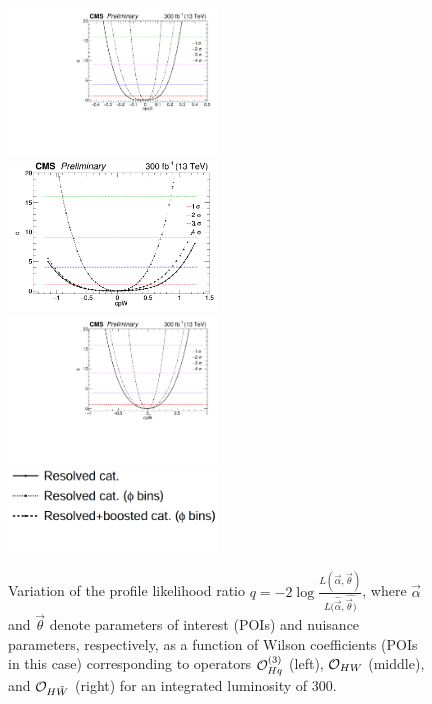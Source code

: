 \documentclass[a4paper,11pt]{article}
\begin{document}
\begin{figure}[hbtp]
\begin{center}
\includegraphics[width=0.495\textwidth]{Figures/RECO/Full_NLL_WC_cpq3i_fine_2019_opt2.pdf}
\includegraphics[width=0.495\textwidth]{Figures/RECO/Full_NLL_WC_cpW_fine_2019_opt2.png}
\includegraphics[width=0.495\textwidth]{Figures/RECO/Full_NLL_WC_cpWtilde_2019_opt2.pdf}  
\includegraphics[width=0.495\textwidth]{Figures/RECO/Selection_270.png}
\end{center}
\caption{
Variation of the profile likelihood ratio $q = -2\log\frac{L(\vec{\alpha},\vec{\theta})}{L(\hat{\vec{\alpha}},\hat{\vec{\theta})}}$, where $\vec{\alpha}$ and $\vec{\theta}$ denote parameters of interest (POIs) and nuisance parameters, respectively, as a function of Wilson coefficients (POIs in this case) corresponding to operators ${\cal O}^{(3)}_{Hq}$ (left), ${\cal O}_{HW}$ (middle), and ${\cal O}_{H\tilde{W}}$ (right) for an integrated luminosity of 300\fbinv.
}
\label{fig:NLL}
\end{figure}
\end{document}
